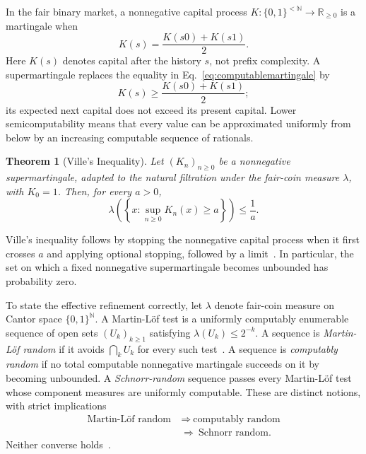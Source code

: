 \documentclass[aps,pra,reprint,superscriptaddress,amsmath,amssymb,floatfix]{revtex4-2}
\theoremstyle{plain}
\newtheorem{theorem}{Theorem}
\theoremstyle{definition}
\theoremstyle{remark}
\begin{document}
In the fair binary market, a nonnegative capital process
\(K\colon\{0,1\}^{<\mathbb{N}}\to\mathbb{R}_{\geq0}\) is a martingale when
\begin{equation}
  K(s)=\frac{K(s0)+K(s1)}2.
  \label{eq:computablemartingale}
\end{equation}
Here \(K(s)\) denotes capital after the history \(s\), not prefix complexity.
A supermartingale replaces the equality in
Eq.~\eqref{eq:computablemartingale} by
\[
  K(s)\geq\frac{K(s0)+K(s1)}2;
\]
its expected next capital does not exceed its present capital. Lower
semicomputability means that every value can be approximated uniformly from
below by an increasing computable sequence of rationals.

\begin{theorem}[Ville's Inequality]
  \label{thm:ville}
  Let \((K_n)_{n\geq0}\) be a nonnegative supermartingale, adapted to the
  natural filtration under the fair-coin measure \(\lambda\), with \(K_0=1\).
  Then, for every \(a>0\),
  \begin{equation}
    \lambda\!\left(
      \left\{x:\sup_{n\geq0}K_n(x)\geq a\right\}
    \right)
    \leq\frac1a.
    \label{eq:ville}
  \end{equation}
\end{theorem}

Ville's inequality follows by stopping the nonnegative capital process when it
first crosses \(a\) and applying optional stopping, followed by a
limit~\cite{Ville1939}. In particular, the set on which a fixed nonnegative
supermartingale becomes unbounded has probability zero.

To state the effective refinement correctly, let \(\lambda\) denote fair-coin
measure on Cantor space \(\{0,1\}^{\mathbb N}\). A Martin-L\"of test is a
uniformly computably enumerable sequence of open sets
\((U_k)_{k\geq1}\) satisfying \(\lambda(U_k)\leq2^{-k}\). A sequence is
\emph{Martin-L\"of random} if it avoids \(\bigcap_k U_k\) for every such
test~\cite{MartinLof1966}. A sequence is \emph{computably random} if no total
computable nonnegative martingale succeeds on it by becoming unbounded. A
\emph{Schnorr-random} sequence passes every Martin-L\"of test whose component
measures are uniformly computable. These are distinct notions, with strict
implications
\begin{equation}
  \begin{aligned}
    \text{Martin-L\"of random}
      &\ \Longrightarrow\ \text{computably random}\\
      &\ \Longrightarrow\ \text{Schnorr random}.
  \end{aligned}
  \label{eq:randomhierarchy}
\end{equation}
Neither converse holds~\cite{schnorr1,Nies2009,DH}.
\end{document}
